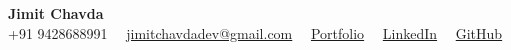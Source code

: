 \begin{center}
  {\Huge\bfseries Jimit Chavda} \\
  \vspace{4pt}
  {\small +91 9428688991 \ \textbullet\ \href{mailto:jimitchavdadev@gmail.com}{jimitchavdadev@gmail.com} \ \textbullet\ \href{https://portfolio-website-rnbw.onrender.com/}{Portfolio} \ \textbullet\ \href{https://www.linkedin.com/in/jimit-chavda/}{LinkedIn} \ \textbullet\ \href{https://github.com/jimitchavdadev}{GitHub}}
\end{center}
